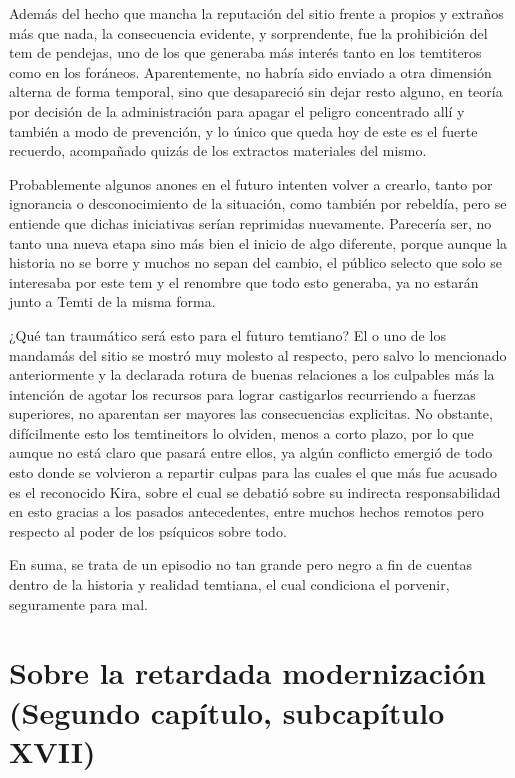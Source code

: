 \documentclass[
  spanish,
]{book}
\begin{document}
Además del hecho que mancha la reputación del sitio frente a propios y extraños más que nada, la consecuencia evidente, y sorprendente, fue la prohibición del tem de pendejas, uno de los que generaba más interés tanto en los temtiteros como en los foráneos. Aparentemente, no habría sido enviado a otra dimensión alterna de forma temporal, sino que desapareció sin dejar resto alguno, en teoría por decisión de la administración para apagar el peligro concentrado allí y también a modo de prevención, y lo único que queda hoy de este es el fuerte recuerdo, acompañado quizás de los extractos materiales del mismo.

Probablemente algunos anones en el futuro intenten volver a crearlo, tanto por ignorancia o desconocimiento de la situación, como también por rebeldía, pero se entiende que dichas iniciativas serían reprimidas nuevamente. Parecería ser, no tanto una nueva etapa sino más bien el inicio de algo diferente, porque aunque la historia no se borre y muchos no sepan del cambio, el público selecto que solo se interesaba por este tem y el renombre que todo esto generaba, ya no estarán junto a Temti de la misma forma.

¿Qué tan traumático será esto para el futuro temtiano? El o uno de los mandamás del sitio se mostró muy molesto al respecto, pero salvo lo mencionado anteriormente y la declarada rotura de buenas relaciones a los culpables más la intención de agotar los recursos para lograr castigarlos recurriendo a fuerzas superiores, no aparentan ser mayores las consecuencias explicitas. No obstante, difícilmente esto los temtineitors lo olviden, menos a corto plazo, por lo que aunque no está claro que pasará entre ellos, ya algún conflicto emergió de todo esto donde se volvieron a repartir culpas para las cuales el que más fue acusado es el reconocido Kira, sobre el cual se debatió sobre su indirecta responsabilidad en esto gracias a los pasados antecedentes, entre muchos hechos remotos pero respecto al poder de los psíquicos sobre todo.

En suma, se trata de un episodio no tan grande pero negro a fin de cuentas dentro de la historia y realidad temtiana, el cual condiciona el porvenir, seguramente para mal.

\hypertarget{sobre-la-retardada-modernizaciuxf3n-segundo-capuxedtulo-subcapuxedtulo-xvii}{%
\section{Sobre la retardada modernización (Segundo capítulo, subcapítulo XVII)}\label{sobre-la-retardada-modernizaciuxf3n-segundo-capuxedtulo-subcapuxedtulo-xvii}}
\end{document}
